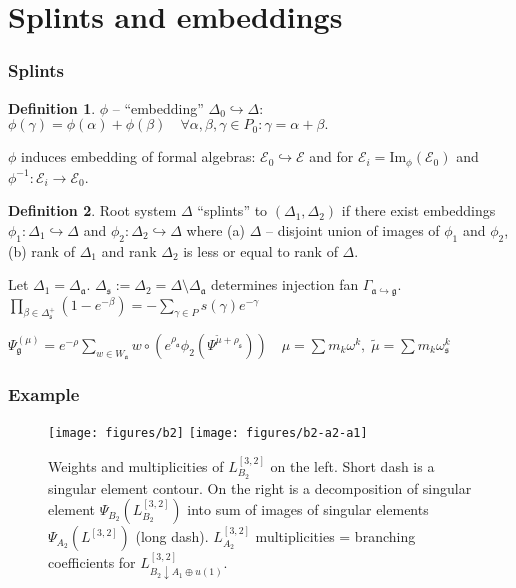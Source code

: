 \documentclass[pdftex]{beamer}
\newcommand{\gf}{\mathfrak{g}}
\newcommand{\af}{\mathfrak{a}}
\newcommand{\sfr}{\mathfrak{s}}
\theoremstyle{definition} \newtheorem{Def}{Definition}
\begin{document}
\section{Splints and embeddings}
\begin{frame}
  \frametitle{Splints}
  \begin{Def}
$\phi $ -- ``embedding'' $\Delta_{0}\hookrightarrow \Delta$:
$\phi (\gamma )=\phi (\alpha )+\phi (\beta )\quad  \forall \alpha ,\beta ,\gamma \in P_{0}: \gamma =\alpha+\beta.$

\end{Def}
$\phi$ induces embedding of formal algebras: ${\mathcal{E}}_0\hookrightarrow \mathcal{E}$ and for ${\mathcal{E}}_i=\mathrm{Im}_{\phi}\left( {\mathcal{E}}_0\right)$ and $\phi^{-1}:{\mathcal{E}}_i \longrightarrow {\mathcal{E}}_0$.

\begin{Def}
Root system $\Delta$ ``splints'' to  $(\Delta _{1},\Delta _{2})$ if there exist embeddings  $\phi _{1}:\Delta _{1}\hookrightarrow \Delta $ and $\phi _{2}:\Delta _{2}\hookrightarrow \Delta $ where (a) $\Delta $ -- disjoint union of images of $\phi _{1}$ and $\phi _{2}$, (b) rank of  $\Delta _{1}$ and rank  $\Delta _{2}$ is less or equal to rank of $\Delta $.
\end{Def}
Let $\Delta _{1}=\Delta _{\af}$. $\Delta _{\sfr}:=\Delta_{2}=\Delta \setminus \Delta _{\af}$ determines injection fan  $\Gamma _{\af\hookrightarrow \gf}$. 
$\prod_{\beta \in \Delta _{\sfr}^{+}}\left( 1-e^{-\beta }\right)
=-\sum_{\gamma \in P}s(\gamma )e^{-\gamma }$

$\Psi _{\gf}^{\left( \mu \right) }=e^{-\rho}\sum_{w\in W_{\af}}w\circ \left(
e^{\rho _{\af}}\phi_{2}\left(\Psi ^{\widetilde{\mu }+\rho _{\sfr}}\right)\right) \quad \mu=\sum m_{k}\omega ^{k},\;\widetilde{\mu }=\sum m_{k}\omega _{\sfr}^{k}$

\end{frame}
\begin{frame}
  \frametitle{Example}
  \vspace{-0.5cm}
\begin{figure}[h!bt]
  \hspace*{-1.2cm}

   \texttt{[image: figures/b2]}
   \texttt{[image: figures/b2-a2-a1]}
  \caption{Weights and multiplicities of  $L^{[3,2]}_{B_{2}}$ on the left. Short dash is a singular element contour. On the right is a decomposition of singular element $\Psi_{B_{2}}(L^{[3,2]}_{B_{2}})$ into sum of images of singular elements $\Psi_{A_{2}}(L^{[3,2]})$ (long dash).  $L^{[3,2]}_{A_{2}}$ multiplicities =  branching coefficients for  $L^{[3,2]}_{B_{2}\downarrow A_{1}\oplus u(1)}$.}

 \label{fig:b2_splint}
\end{figure}

\end{frame}
\end{document}
